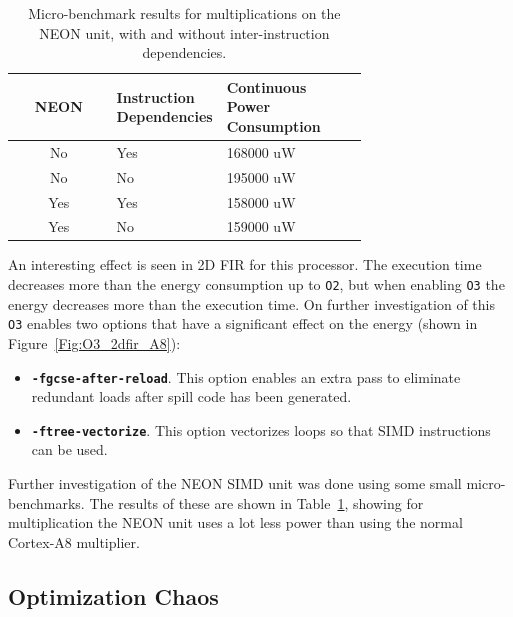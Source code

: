 \documentclass[twocolumn]{article}
\let\oldcaption\caption
\renewcommand{\caption}[1]{\oldcaption{\textup{#1}}}
\begin{document}
\begin{table}
	\centering
	\begin{tabular}{c p{0.3\linewidth} p{0.4\linewidth}}
		\bfseries NEON & \bfseries Instruction Dependencies & \bfseries Continuous Power Consumption \\
		\hline
		No & \centering Yes & {\hspace{0.85cm} 168000 uW } \\
		No & \centering No & {\hspace{0.85cm} 195000 uW } \\
		Yes & \centering Yes & {\hspace{0.85cm} 158000 uW } \\
		Yes & \centering No & {\hspace{0.85cm} 159000 uW } \\
	\end{tabular}
	\caption{Micro-benchmark results for multiplications on the NEON unit, with and without inter-instruction dependencies.}
	\label{Table:SIMD}
\end{table}

An interesting effect is seen in 2D FIR for this processor. The execution time decreases more than the energy consumption up to \texttt{O2}, but when enabling \texttt{O3} the energy decreases more than the execution time. On further investigation of this \texttt{O3} enables two options that have a significant effect on the energy (shown in Figure~\ref{Fig:O3_2dfir_A8}):
\begin{itemize}
	\item \texttt{\bfseries -fgcse-after-reload}. This option enables an extra pass to eliminate redundant loads after spill code has been generated.
	\item \texttt{\bfseries -ftree-vectorize}. This option vectorizes loops so that SIMD instructions can be used.
\end{itemize}

Further investigation of the NEON SIMD unit was done using some small micro-benchmarks. The results of these are shown in Table~\ref{Table:SIMD}, showing for multiplication the NEON unit uses a lot less power than using the normal Cortex-A8 multiplier.

\subsection{Optimization Chaos}
\end{document}
